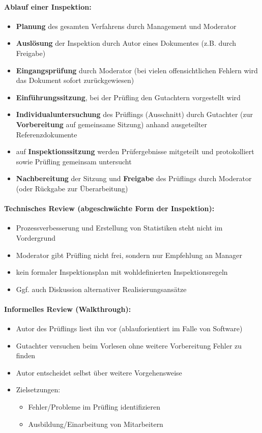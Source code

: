 \paragraph{Ablauf einer Inspektion:}
\begin{itemize}
	\item \textbf{Planung} des gesamten Verfahrens durch Management und Moderator
	\item \textbf{Auslösung} der Inspektion durch Autor eines Dokumentes (z.B. durch Freigabe)
	\item \textbf{Eingangsprüfung} durch Moderator (bei vielen offensichtlichen Fehlern wird das Dokument sofort zurückgewiesen) 
	\item \textbf{Einführungssitzung}, bei der Prüfling den Gutachtern vorgestellt wird
	\item \textbf{Individualuntersuchung} des Prüflings (Ausschnitt) durch Gutachter (zur \textbf{Vorbereitung} auf gemeinsame Sitzung) anhand ausgeteilter Referenzdokumente 
	\item auf \textbf{Inspektionssitzung} werden Prüfergebnisse mitgeteilt und protokolliert sowie Prüfling gemeinsam untersucht
	\item \textbf{Nachbereitung} der Sitzung und  \textbf{Freigabe} des Prüflings durch Moderator (oder Rückgabe zur Überarbeitung)
\end{itemize}

\paragraph{Technisches Review (abgeschwächte Form der Inspektion):}
\begin{itemize}
	\item Prozessverbesserung und Erstellung von Statistiken steht nicht im Vordergrund
	\item Moderator gibt Prüfling nicht frei, sondern nur Empfehlung an Manager
	\item kein formaler Inspektionsplan mit wohldefinierten Inspektionsregeln
	\item Ggf. auch Diskussion alternativer Realisierungsansätze
\end{itemize}

\paragraph{Informelles Review (Walkthrough):}
\begin{itemize}
	\item Autor des Prüflings liest ihn vor (ablauforientiert im Falle von Software) 
	\item Gutachter versuchen beim Vorlesen ohne weitere Vorbereitung Fehler zu finden
	\item Autor entscheidet selbst über weitere Vorgehensweise
	\item Zielsetzungen:
	\begin{itemize}
		\item Fehler/Probleme im Prüfling identifizieren
		\item Ausbildung/Einarbeitung von Mitarbeitern
	\end{itemize}
\end{itemize}

